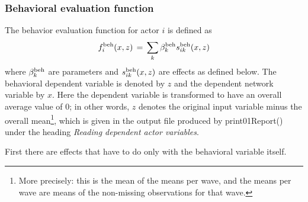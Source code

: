 \documentclass[a4paper,fleqn,11pt]{article}
\newcommand{\+}{\, + \,}
\newcommand{\sfn}[1]{\textsf{#1}}
\begin{document}
\subsubsection{Behavioral evaluation function}
\label{S_f_b}

The behavior evaluation function for actor $i$ is defined as
\begin{equation}
f^{\rm beh}_i(x, z) \, = \, \sum_k \beta^{\rm beh}_k s^{\rm beh}_{ik}(x, z)
                                             \label{f_beh}
\end{equation}
where $\beta^{\rm beh}_k$ are parameters and $s^{\rm beh}_{ik}(x, z)$
are effects as defined below.
The behavioral dependent variable is denoted by $z$ and the
dependent network variable by $x$.
Here the dependent variable is transformed
to have an overall average value of 0;
in other words, $z$ denotes the original input variable
minus the overall mean\footnote{More precisely: \label{meandef}
this is the mean of the means per wave, and the
means per wave are means of the non-missing observations
for that wave.}, which is given in the
output file produced by \sfn{print01Report()} under the heading
\emph{Reading dependent actor variables}.

First there are effects that have to do only
with the behavioral variable itself.
\end{document}
